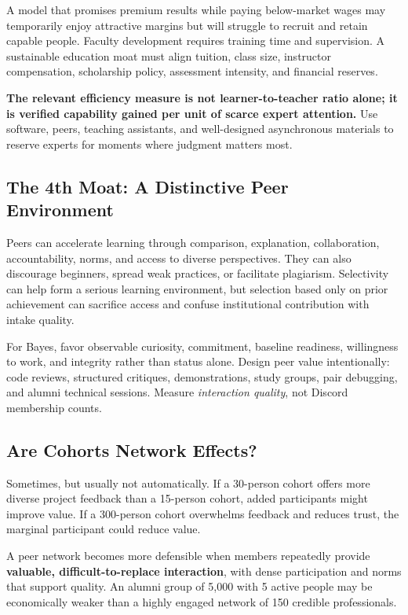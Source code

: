 A model that promises premium results while paying below-market wages may temporarily enjoy attractive margins but will struggle to recruit and retain capable people. Faculty development requires training time and supervision. A sustainable education moat must align tuition, class size, instructor compensation, scholarship policy, assessment intensity, and financial reserves.

\textbf{The relevant efficiency measure is not learner-to-teacher ratio alone; it is verified capability gained per unit of scarce expert attention.} Use software, peers, teaching assistants, and well-designed asynchronous materials to reserve experts for moments where judgment matters most.

\subsection{The 4th Moat: A Distinctive Peer Environment}
\label{sec:fourth_moat_peer_environment}

Peers can accelerate learning through comparison, explanation, collaboration, accountability, norms, and access to diverse perspectives. They can also discourage beginners, spread weak practices, or facilitate plagiarism. Selectivity can help form a serious learning environment, but selection based only on prior achievement can sacrifice access and confuse institutional contribution with intake quality.

For Bayes, favor observable curiosity, commitment, baseline readiness, willingness to work, and integrity rather than status alone. Design peer value intentionally: code reviews, structured critiques, demonstrations, study groups, pair debugging, and alumni technical sessions. Measure \textit{interaction quality}, not Discord membership counts.

\subsection{Are Cohorts Network Effects?}
\label{sec:are_cohorts_network_effects}

Sometimes, but usually not automatically. If a 30-person cohort offers more diverse project feedback than a 15-person cohort, added participants might improve value. If a 300-person cohort overwhelms feedback and reduces trust, the marginal participant could reduce value.

A peer network becomes more defensible when members repeatedly provide \textbf{valuable, difficult-to-replace interaction}, with dense participation and norms that support quality. An alumni group of 5,000 with 5 active people may be economically weaker than a highly engaged network of 150 credible professionals.

